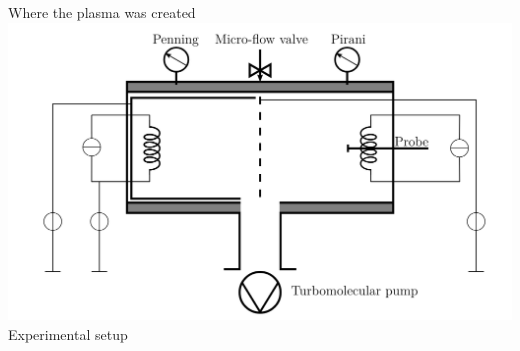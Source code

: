 \documentclass[10pt]{beamer}
\begin{document}
\begin{frame}{Where the plasma was created}
    \centering
    \includegraphics[width=\textwidth]{../figures/experimental_setup_Willemin_Zahar.png} 
    \\
    Experimental setup
\end{frame}
\end{document}
